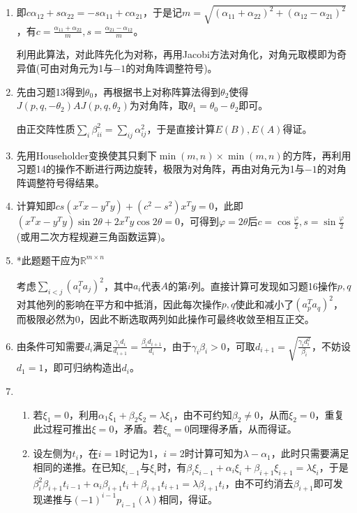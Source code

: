 \documentclass[a4paper,UTF8,fontset=windows]{ctexart}
\begin{document}
\begin{enumerate}
\item
即$c\alpha_{12}+s\alpha_{22}=-s\alpha_{11}+c\alpha_{21}$，于是记$m=\sqrt{(\alpha_{11}+\alpha_{22})^2+(\alpha_{12}-\alpha_{21})^2}$，有$c=\frac{\alpha_{11}+\alpha_{22}}{m},s=\frac{\alpha_{21}-\alpha_{12}}{m}$。

利用此算法，对此阵先化为对称，再用Jacobi方法对角化，对角元取模即为奇异值(可由对角元为1与$-1$的对角阵调整符号)。

\item
先由习题13得到$\theta_0$，再根据书上对称阵算法得到$\theta_2$使得$J(p,q,-\theta_2)AJ(p,q,\theta_2)$为对角阵，取$\theta_1=\theta_0-\theta_2$即可。

由正交阵性质$\sum_i\beta_{ii}^2=\sum_{ij}\alpha_{ij}^2$，于是直接计算$E(B),E(A)$得证。

\item
先用Householder变换使其只剩下$\min(m,n)\times\min(m,n)$的方阵，再利用习题14的操作不断进行两边旋转，极限为对角阵，再由对角元为1与$-1$的对角阵调整符号得结果。

\item
计算知即$cs(x^Tx-y^Ty)+(c^2-s^2)x^Ty=0$，此即$(x^Tx-y^Ty)\sin2\theta+2x^Ty\cos2\theta=0$，可得到$\varphi=2\theta$后$c=\cos\frac{\varphi}{2},s=\sin\frac{\varphi}{2}$(或用二次方程规避三角函数运算)。

\item
*此题题干应为$\mathbb{R}^{m\times n}$

考虑$\sum_{i<j}(a_i^Ta_j)^2$，其中$a_i$代表$A$的第$i$列。直接计算可发现如习题16操作$p,q$对其他列的影响在平方和中抵消，因此每次操作$p,q$使此和减小了$(a_p^Ta_q)^2$，而极限必然为0，因此不断选取两列如此操作可最终收敛至相互正交。

\item
由条件可知需要$d_i$满足$\frac{\gamma_id_i}{d_{i+1}}=\frac{\beta_id_{i+1}}{d_i}$，由于$\gamma_i\beta_i>0$，可取$d_{i+1}=\sqrt{\frac{\gamma_id_i^2}{\beta_i}}$，不妨设$d_1=1$，即可归纳构造出$d_i$。

\item
\begin{enumerate}[(1)]
\item
若$\xi_1=0$，利用$\alpha_1\xi_1+\beta_2\xi_2=\lambda \xi_1$，由不可约知$\beta_2\ne0$，从而$\xi_2=0$，重复此过程可推出$\xi=0$，矛盾。若$\xi_n=0$同理得矛盾，从而得证。

\item
设左侧为$t_i$，在$i=1$时记为1，$i=2$时计算可知为$\lambda-\alpha_1$，此时只需要满足相同的递推。在已知$\xi_{i-1}$与$\xi_i$时，有$\beta_i\xi_{i-1}+\alpha_i\xi_i+\beta_{i+1}\xi_{i+1}=\lambda\xi_i$，于是$\beta_i^2\beta_{i+1}t_{i-1}+\alpha_i\beta_{i+1}t_i+\beta_{i+1}t_{i+1}=\lambda\beta_{i+1}t_i$，由不可约消去$\beta_{i+1}$即可发现递推与$(-1)^{i-1}p_{i-1}(\lambda)$相同，得证。
\end{enumerate}


\end{enumerate}
\end{document}
